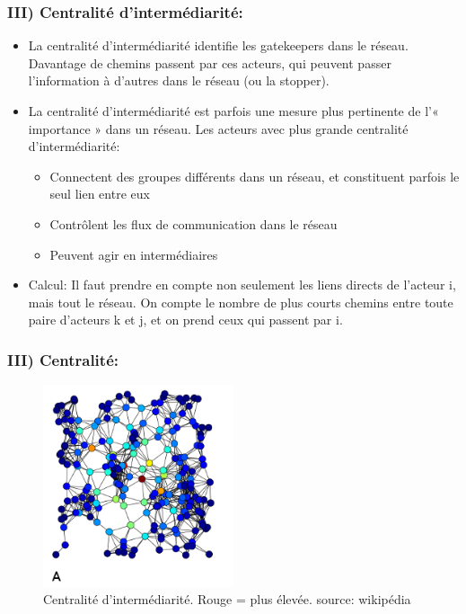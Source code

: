 \documentclass{beamer}
\begin{document}
\begin{frame}
    \frametitle{III) Centralité d’intermédiarité:}
    \begin{itemize}
        \item La centralité d’intermédiarité identifie les gatekeepers dans le réseau. Davantage de chemins passent par ces acteurs, qui peuvent passer l’information à d’autres dans le réseau (ou la stopper).
        \item La centralité d’intermédiarité est parfois une mesure plus pertinente de l’« importance » dans un réseau. Les acteurs avec plus grande centralité d’intermédiarité: \begin{itemize}
            \item Connectent des groupes différents dans un réseau, et constituent parfois le seul lien entre eux
            \item Contrôlent les flux de communication dans le réseau
            \item Peuvent agir en intermédiaires
        \end{itemize}
        \item Calcul: Il faut prendre en compte non seulement les liens directs de l’acteur i, mais tout le réseau. On compte le nombre de plus courts chemins entre toute paire d’acteurs k et j, et on prend ceux qui passent par i.
    \end{itemize}
\end{frame}

\begin{frame}
    \frametitle{III) Centralité:}
    \begin{figure}
        \centering
        \includegraphics[width = 0.5\textwidth]{intermediarite.png}
        \caption{\small{Centralité d'intermédiarité. Rouge = plus élevée. source: wikipédia}}
      \end{figure}
\end{frame}
\end{document}
